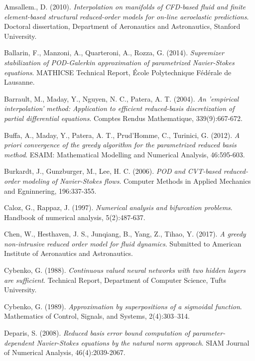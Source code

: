 \documentclass[12pt, a4paper, twoside, openright]{report}
\numberwithin{equation}{chapter}
\theoremstyle{theorem}
\theoremstyle{definition}
\theoremstyle{remark}
\theoremstyle{proposition}
\numberwithin{figure}{chapter}
\begin{document}
	\begin{thebibliography}{50}
	
		Amsallem., D. (2010). \emph{Interpolation on manifolds of CFD-based fluid and finite element-based structural reduced-order models for on-line aeroelastic predictions}. Doctoral dissertation, Department of Aeronautics and Astronautics, Stanford University.
		
		Ballarin, F., Manzoni, A., Quarteroni, A., Rozza, G. (2014). \emph{Supremizer stabilization of POD-Galerkin approximation of parametrized Navier-Stokes equations}. MATHICSE Technical Report, \'Ecole Polytechnique F\'ed\'erale de Lausanne.
	
		Barrault, M., Maday, Y., Nguyen, N. C., Patera, A. T. (2004). \emph{An 'empirical interpolation' method: Application to efficient reduced-basis discretization of partial differential equations}. Comptes Rendus Mathematique, 339(9):667-672.
		
		Buffa, A., Maday, Y., Patera, A. T., Prud'Homme, C., Turinici, G. (2012). \emph{A priori convergence of the greedy algorithm for the parametrized reduced basis method}. ESAIM: Mathematical Modelling and Numerical Analysis, 46:595-603.
		
		Burkardt, J., Gunzburger, M., Lee, H. C. (2006). \emph{POD and CVT-based reduced-order modeling of Navier-Stokes flows}. Computer Methods in Applied Mechanics and Egninnering, 196:337-355.
		
		Caloz, G., Rappaz, J. (1997). \emph{Numerical analysis and bifurcation problems}. Handbook of numerical analysis, 5(2):487-637.
		
		Chen, W., Hesthaven, J. S., Junqiang, B., Yang, Z., Tihao, Y. (2017). \emph{A greedy non-intrusive reduced order model for fluid dynamics}. Submitted to American Institute of Aeronautics and Astronautics.
	
		Cybenko, G. (1988). \emph{Continuous valued neural networks with two hidden layers are sufficient}. Technical Report, Department of Computer Science, Tufts University.
		
		Cybenko, G. (1989). \emph{Approximation by superpositions of a sigmoidal function}. Mathematics of Control, Signals, and Systems, 2(4):303–314.
		
		Deparis, S. (2008). \emph{Reduced basis error bound computation of parameter-dependent Navier-Stokes equations by the natural norm approach}. SIAM Journal of Numerical Analysis, 46(4):2039-2067.
		

\end{thebibliography}
\end{document}
